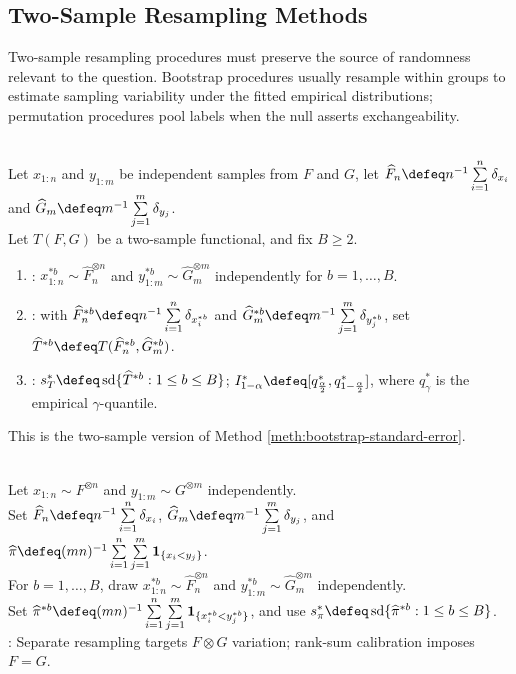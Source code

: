 \subsection{Two-Sample Resampling Methods}

Two-sample resampling procedures must preserve the source of randomness relevant to the question.  Bootstrap procedures usually resample within groups to estimate sampling variability under the fitted empirical distributions; permutation procedures pool labels when the null asserts exchangeability.

\begin{method} \label{meth:two-sample-bootstrap} \\
Let $x_{1:n}$ and $y_{1:m}$ be independent samples from $F$ and $G$, let $\widehat{F}_n\defeq n^{-1}\sum\limits_{i=1}^{n}\delta_{x_i}$ and $\widehat{G}_m\defeq m^{-1}\sum\limits_{j=1}^{m}\delta_{y_j}$.\\
Let $T(F,G)$ be a two-sample functional, and fix $B\geq2$.
\begin{enumerate}[label=(\roman*)]
\setlength{\itemsep}{0pt}
\item {}: $x_{1:n}^{\ast b}\sim\widehat{F}_n^{\otimes n}$ and $y_{1:m}^{\ast b}\sim\widehat{G}_m^{\otimes m}$ independently for $b=1,\ldots,B$.
\item {}: with $\widehat{F}_n^{\ast b}\defeq n^{-1}\sum\limits_{i=1}^{n}\delta_{x_i^{\ast b}}$ and $\widehat{G}_m^{\ast b}\defeq m^{-1}\sum\limits_{j=1}^{m}\delta_{y_j^{\ast b}}$, set $\widehat{T}^{\ast b}\defeq T(\widehat{F}_n^{\ast b},\widehat{G}_m^{\ast b})$.
\item {}: $s_T^\ast\defeq\operatorname{sd}\{\widehat{T}^{\ast b}:1\leq b\leq B\}$; $I_{1-\alpha}^\ast\defeq[q_{\frac{\alpha}{2}}^\ast,q_{1-\frac{\alpha}{2}}^\ast]$, where $q_\gamma^\ast$ is the empirical $\gamma$-quantile.
\end{enumerate}
This is the two-sample version of Method \ref{meth:bootstrap-standard-error}.
\end{method}

\begin{example} \label{ex:bootstrap-mann-whitney-effect} \\
Let $x_{1:n}\sim F^{\otimes n}$ and $y_{1:m}\sim G^{\otimes m}$ independently.\\
Set $\widehat{F}_n\defeq n^{-1}\sum\limits_{i=1}^{n}\delta_{x_i}$, $\widehat{G}_m\defeq m^{-1}\sum\limits_{j=1}^{m}\delta_{y_j}$, and $\widehat{\pi}\defeq(mn)^{-1}\sum\limits_{i=1}^{n}\sum\limits_{j=1}^{m}\mathbf{1}_{\{x_i<y_j\}}$.\\
For $b=1,\ldots,B$, draw $x_{1:n}^{\ast b}\sim\widehat{F}_n^{\otimes n}$ and $y_{1:m}^{\ast b}\sim\widehat{G}_m^{\otimes m}$ independently.\\
Set $\widehat{\pi}^{\ast b}\defeq(mn)^{-1}\sum\limits_{i=1}^{n}\sum\limits_{j=1}^{m}\mathbf{1}_{\{x_i^{\ast b}<y_j^{\ast b}\}}$, and use $s_\pi^\ast\defeq\operatorname{sd}\{\widehat{\pi}^{\ast b}:1\leq b\leq B\}$.\\
: Separate resampling targets $F\otimes G$ variation; rank-sum calibration imposes $F=G$.
\end{example}

